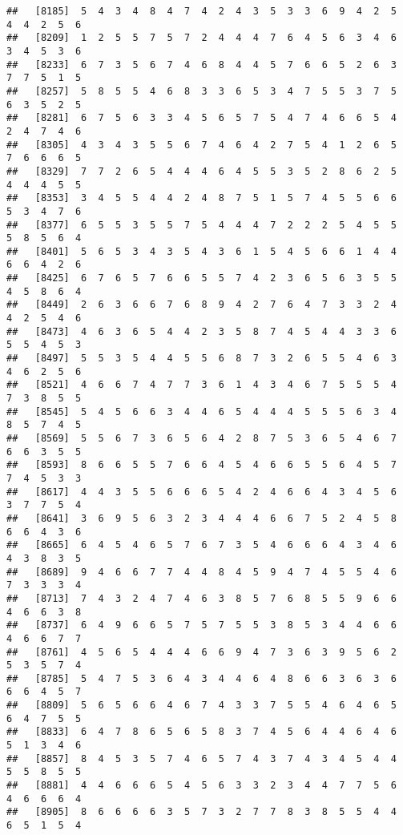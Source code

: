 \documentclass[
]{book}
\begin{document}
\begin{verbatim}
##   [8185]  5  4  3  4  8  4  7  4  2  4  3  5  3  3  6  9  4  2  5  4  4  2  5  6
##   [8209]  1  2  5  5  7  5  7  2  4  4  4  7  6  4  5  6  3  4  6  3  4  5  3  6
##   [8233]  6  7  3  5  6  7  4  6  8  4  4  5  7  6  6  5  2  6  3  7  7  5  1  5
##   [8257]  5  8  5  5  4  6  8  3  3  6  5  3  4  7  5  5  3  7  5  6  3  5  2  5
##   [8281]  6  7  5  6  3  3  4  5  6  5  7  5  4  7  4  6  6  5  4  2  4  7  4  6
##   [8305]  4  3  4  3  5  5  6  7  4  6  4  2  7  5  4  1  2  6  5  7  6  6  6  5
##   [8329]  7  7  2  6  5  4  4  4  6  4  5  5  3  5  2  8  6  2  5  4  4  4  5  5
##   [8353]  3  4  5  5  4  4  2  4  8  7  5  1  5  7  4  5  5  6  6  5  3  4  7  6
##   [8377]  6  5  5  3  5  5  7  5  4  4  4  7  2  2  2  5  4  5  5  5  8  5  6  4
##   [8401]  5  6  5  3  4  3  5  4  3  6  1  5  4  5  6  6  1  4  4  6  6  4  2  6
##   [8425]  6  7  6  5  7  6  6  5  5  7  4  2  3  6  5  6  3  5  5  4  5  8  6  4
##   [8449]  2  6  3  6  6  7  6  8  9  4  2  7  6  4  7  3  3  2  4  4  2  5  4  6
##   [8473]  4  6  3  6  5  4  4  2  3  5  8  7  4  5  4  4  3  3  6  5  5  4  5  3
##   [8497]  5  5  3  5  4  4  5  5  6  8  7  3  2  6  5  5  4  6  3  4  6  2  5  6
##   [8521]  4  6  6  7  4  7  7  3  6  1  4  3  4  6  7  5  5  5  4  7  3  8  5  5
##   [8545]  5  4  5  6  6  3  4  4  6  5  4  4  4  5  5  5  6  3  4  8  5  7  4  5
##   [8569]  5  5  6  7  3  6  5  6  4  2  8  7  5  3  6  5  4  6  7  6  6  3  5  5
##   [8593]  8  6  6  5  5  7  6  6  4  5  4  6  6  5  5  6  4  5  7  7  4  5  3  3
##   [8617]  4  4  3  5  5  6  6  6  5  4  2  4  6  6  4  3  4  5  6  3  7  7  5  4
##   [8641]  3  6  9  5  6  3  2  3  4  4  4  6  6  7  5  2  4  5  8  6  6  4  3  6
##   [8665]  6  4  5  4  6  5  7  6  7  3  5  4  6  6  6  4  3  4  6  4  3  8  3  5
##   [8689]  9  4  6  6  7  7  4  4  8  4  5  9  4  7  4  5  5  4  6  7  3  3  3  4
##   [8713]  7  4  3  2  4  7  4  6  3  8  5  7  6  8  5  5  9  6  6  4  6  6  3  8
##   [8737]  6  4  9  6  6  5  7  5  7  5  5  3  8  5  3  4  4  6  6  4  6  6  7  7
##   [8761]  4  5  6  5  4  4  4  6  6  9  4  7  3  6  3  9  5  6  2  5  3  5  7  4
##   [8785]  5  4  7  5  3  6  4  3  4  4  6  4  8  6  6  3  6  3  6  6  6  4  5  7
##   [8809]  5  6  5  6  6  4  6  7  4  3  3  7  5  5  4  6  4  6  5  6  4  7  5  5
##   [8833]  6  4  7  8  6  5  6  5  8  3  7  4  5  6  4  4  6  4  6  5  1  3  4  6
##   [8857]  8  4  5  3  5  7  4  6  5  7  4  3  7  4  3  4  5  4  4  5  5  8  5  5
##   [8881]  4  4  6  6  6  5  4  5  6  3  3  2  3  4  4  7  7  5  6  4  6  6  6  4
##   [8905]  8  6  6  6  6  3  5  7  3  2  7  7  8  3  8  5  5  4  4  6  5  1  5  4

\end{verbatim}
\end{document}
